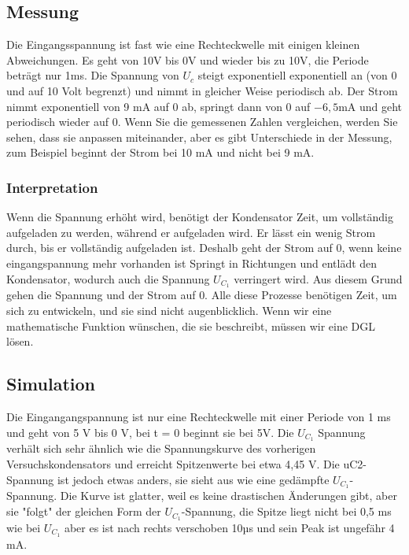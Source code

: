 %
%
\subsection{Messung}
 Die Eingangsspannung ist fast wie eine Rechteckwelle mit einigen kleinen Abweichungen. Es geht von 10V bis 0V und wieder bis zu 10V, die Periode beträgt nur 1ms. Die Spannung von $U_c$ steigt exponentiell exponentiell an (von 0 und auf 10 Volt begrenzt) und nimmt in gleicher Weise periodisch ab. Der Strom nimmt exponentiell von 9 $\si{\milli\ampere}$ auf 0 ab, springt dann von 0 auf $-6,5 
\si{\milli\ampere} $ und geht periodisch wieder auf 0. Wenn Sie die gemessenen Zahlen vergleichen, werden Sie sehen, dass sie anpassen miteinander, aber es gibt Unterschiede in der Messung, zum Beispiel beginnt der Strom bei 10 $\si{\milli\ampere}$ und nicht bei 9 $\si{\milli\ampere}$.

\subsubsection{Interpretation}

Wenn die Spannung erhöht wird, benötigt der Kondensator Zeit, um vollständig aufgeladen zu werden, während er aufgeladen wird. Er lässt ein wenig Strom durch, bis er vollständig aufgeladen ist. Deshalb geht der Strom auf 0, wenn keine eingangspannung mehr vorhanden ist Springt in Richtungen und entlädt den Kondensator, wodurch auch die Spannung $U_{C_1}$ verringert wird. Aus diesem Grund gehen die Spannung und der Strom auf 0. Alle diese Prozesse benötigen Zeit, um sich zu entwickeln, und sie sind nicht augenblicklich. Wenn wir eine mathematische Funktion wünschen, die sie beschreibt, müssen wir eine DGL lösen.

\subsection{Simulation} Die Eingangangspannung ist nur eine Rechteckwelle mit einer Periode von 1 ms und geht von 5 V bis 0 V, bei t = 0 beginnt sie bei 5V. Die $U_{C_1}$ Spannung verhält sich sehr ähnlich wie die Spannungskurve des vorherigen Versuchskondensators und erreicht Spitzenwerte bei etwa 4,45 V. Die uC2-Spannung ist jedoch etwas anders, sie sieht aus wie eine gedämpfte $U_{C_1}$-Spannung. Die Kurve ist glatter, weil es keine drastischen Änderungen gibt, aber sie "folgt" der gleichen Form der $U_{C_1}$-Spannung, die Spitze liegt nicht bei 0,5 ms wie bei $U_{C_1}$ aber es ist nach rechts verschoben 10µs und sein Peak ist ungefähr 4$\si{\milli\ampere}$.



